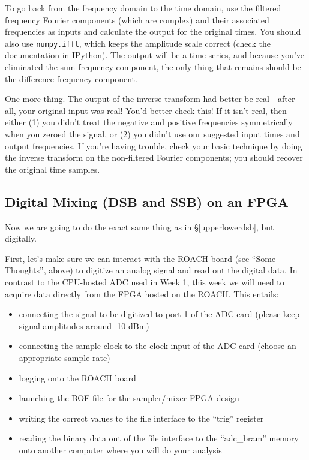 \documentclass[11pt]{article}
\begin{document}
To go back from the frequency domain to the time domain, use the 
  filtered frequency Fourier components (which are complex) and their associated frequencies
  as inputs and calculate the output for the original times.
  You should also use {\tt numpy.ifft}, which keeps the
  amplitude scale correct (check the documentation in IPython).
  The output will be a time series, and because you've
  eliminated the sum frequency component, the only thing that remains
  should be the difference frequency component.

One more thing. The output of the inverse transform had better be
real---after all, your original input was real! You'd better check this!
If it isn't real, then either (1) you didn't treat the negative and positive
frequencies symmetrically when you zeroed the signal, or (2) you didn't
use our suggested input times and output frequencies. If you're having
trouble, check your basic technique by doing the inverse transform on
the non-filtered Fourier components; you should recover the original
time samples.

\subsection{Digital Mixing (DSB and SSB) on an FPGA} \label{digital_mixing}

Now we are going to do the exact same thing as in \S\ref{upperlowerdsb}, but digitally.

First, let's make sure we can interact with the ROACH board (see ``Some Thoughts'', above)
to digitize an analog signal and read out the digital data.  In contrast to the CPU-hosted ADC
used in Week 1, this week we will need to acquire data directly from the FPGA hosted on the ROACH.
This entails:
\begin{itemize}[noitemsep,nolistsep]
\item connecting the signal to be digitized to port 1 of the ADC card (please keep signal amplitudes around -10 dBm)
\item connecting the sample clock to the clock input of the ADC card (choose an appropriate sample rate)
\item logging onto the ROACH board
\item launching the BOF file for the sampler/mixer FPGA design
\item writing the correct values to the file interface to the ``trig'' register
\item reading the binary data out of the file interface to the ``adc\_bram'' memory onto another computer
where you will do your analysis
\end{itemize}
\end{document}
